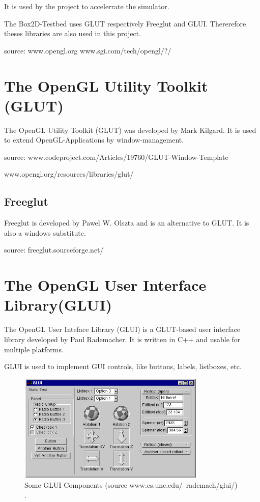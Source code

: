 \documentclass[10pt,a4paper,DIV=11]{scrreprt}
\begin{document}
It is used by the project to accelerrate the simulator.

The Box2D-Testbed uses GLUT respectively Freeglut and GLUI. Thererefore theses libraries are also used in this project.

source: www.opengl.org
www.sgi.com/tech/opengl/?/


\section{The OpenGL Utility Toolkit (GLUT)}
The OpenGL Utility Toolkit (GLUT) was developed by Mark Kilgard. It is used to extend OpenGL-Applications by window-management.

source: www.codeproject.com/Articles/19760/GLUT-Window-Template

www.opengl.org/resources/libraries/glut/

\subsection{Freeglut}
Freeglut is developed by Pawel W. Olszta and is an alternative to GLUT. It is also a windows substitute.

source: freeglut.sourceforge.net/


\section{The OpenGL User Interface Library(GLUI)}
The OpenGL User Inteface Library (GLUI) is a GLUT-based user interface library developed by Paul Rademacher. It is written in C++ and usable for multiple platforms.

GLUI is used to implement GUI controls, like buttons, labels, listboxes, etc.

\begin{center}
	\begin{figure}[H]
		\centering
		\includegraphics[width=0.8\textwidth,scale=1.0]{files/glui.png}  
		\caption{Some GLUI Components (source www.cs.unc.edu/~rademach/glui/) \cite{ogl-glui}.}
		\label{fig:ogl-glui}
	\end{figure}
\end{center}
\end{document}
